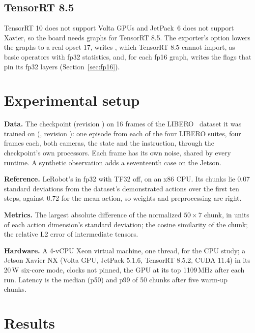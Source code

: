 \documentclass[conference]{IEEEtran}
\begin{document}
\subsection{TensorRT 8.5}
TensorRT 10 does not support Volta GPUs and JetPack~6 does not support Xavier, so the board needs graphs for TensorRT 8.5. The exporter's  option lowers the graphs to a real opset 17, writes , which TensorRT 8.5 cannot import, as basic operators with fp32 statistics, and, for each fp16 graph, writes the  flags that pin its fp32 layers (Section~\ref{sec:fp16}).

\section{Experimental setup}
\label{sec:setup}

\textbf{Data.} The  checkpoint (revision ) on 16 frames of the LIBERO~\cite{liu2023libero} dataset it was trained on (, revision ): one episode from each of the four LIBERO suites, four frames each, both cameras, the state and the instruction, through the checkpoint's own processors. Each frame has its own noise, shared by every runtime. A synthetic observation adds a seventeenth case on the Jetson.

\textbf{Reference.} LeRobot's  in fp32 with TF32 off, on an x86 CPU. Its chunks lie 0.07 standard deviations from the dataset's demonstrated actions over the first ten steps, against 0.72 for the mean action, so weights and preprocessing are right.

\textbf{Metrics.} The largest absolute difference of the normalized $50{\times}7$ chunk, in units of each action dimension's standard deviation; the cosine similarity of the chunk; the relative L2 error of intermediate tensors.

\textbf{Hardware.} A 4-vCPU Xeon virtual machine, one thread, for the CPU study; a Jetson Xavier NX (Volta GPU, JetPack 5.1.6, TensorRT 8.5.2, CUDA 11.4) in its 20\,W six-core mode, clocks not pinned, the GPU at its top 1109\,MHz after each run. Latency is the median (p50) and p99 of 50 chunks after five warm-up chunks.

\section{Results}
\label{sec:results}
\end{document}
